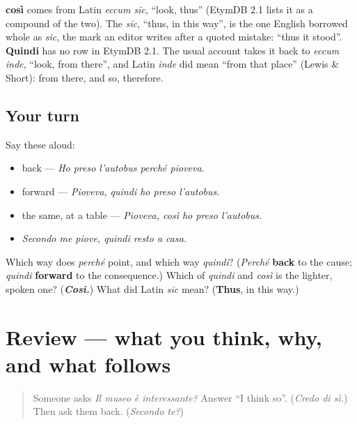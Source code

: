 \begin{cousinweb}
\textbf{così} comes from Latin \emph{eccum sīc}, \textquotedblleft{}look, thus\textquotedblright{} (EtymDB 2.1 lists it as a compound of the two). The \emph{sīc}, \textquotedblleft{}thus, in this way\textquotedblright{}, is the one English borrowed whole as \emph{sic}, the mark an editor writes after a quoted mistake: \textquotedblleft{}thus it stood\textquotedblright{}. \textbf{Quindi} has no row in EtymDB 2.1. The usual account takes it back to \emph{eccum inde}, \textquotedblleft{}look, from there\textquotedblright{}, and Latin \emph{inde} did mean \textquotedblleft{}from that place\textquotedblright{} (Lewis \& Short): from there, and so, therefore.
\end{cousinweb}

\subsection*{Your turn}
Say these aloud:

\begin{itemize}
\raggedright
  \item back — \emph{Ho preso l'autobus perché pioveva.}
  \item forward — \emph{Pioveva, quindi ho preso l'autobus.}
  \item the same, at a table — \emph{Pioveva, così ho preso l'autobus.}
  \item \emph{Secondo me piove, quindi resto a casa.}
\end{itemize}

\begin{tcolorbox}[breakable,colback=teal!4,colframe=teal!35!black,title={Before you move on}]
Which way does \emph{perché} point, and which way \emph{quindi}? (\emph{Perché} \textbf{back} to the cause; \emph{quindi} \textbf{forward} to the consequence.) Which of \emph{quindi} and \emph{così} is the lighter, spoken one? (\emph{\textbf{Così.}}) What did Latin \emph{sīc} mean? (\textbf{Thus}, in this way.)
\end{tcolorbox}
\section[(review)]{Review — what you think, why, and what follows}

\label{lesson:IT-C265-ripasso-opinione}



\begin{quote}
Someone asks \emph{Il museo è interessante?} Answer \textquotedblleft{}I think so\textquotedblright{}. (\emph{Credo di sì.}) Then ask them back. (\emph{Secondo te?})
\end{quote}

